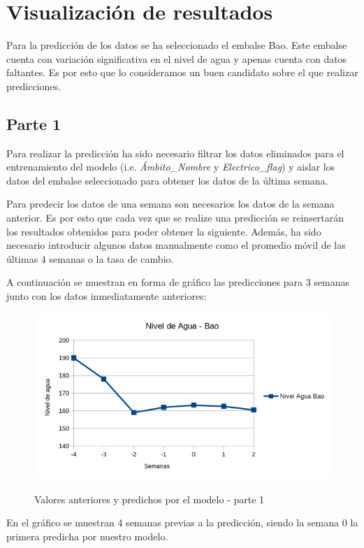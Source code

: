 \documentclass[12pt]{report} %
\begin{document}
\chapter{Visualización de resultados}
\label{chap:result-visualizing}

Para la predicción de los datos se ha seleccionado el embalse Bao. Este embalse cuenta con variación significativa en el nivel de agua y apenas cuenta con datos faltantes. Es por esto que lo consideramos un buen candidato sobre el que realizar predicciones.

\section{Parte 1}
Para realizar la predicción ha sido necesario filtrar los datos eliminados para el entrenamiento del modelo (i.e. \textit{Ámbito\_Nombre} y \textit{Electrico\_flag}) y aislar los datos del embalse seleccionado para obtener los datos de la última semana.

Para predecir los datos de una semana son necesarios los datos de la semana anterior. Es por esto que cada vez que se realize una predicción se reinsertarán los resultados obtenidos para poder obtener la siguiente. Además, ha sido necesario introducir algunos datos manualmente como el promedio móvil de las últimas 4 semanas o la tasa de cambio.

A continuación se muestran en forma de gráfico las predicciones para 3 semanas junto con los datos inmediatamente anteriores:

\begin{figure}[H]
    \includegraphics[width=0.85\linewidth]{predict-1-bao.png}\\
    \caption{\small Valores anteriores y  predichos por el modelo - parte 1}
\end{figure}
En el gráfico se muestran 4 semanas previas a la predicción, siendo la semana 0 la primera predicha por nuestro modelo.
\end{document}
